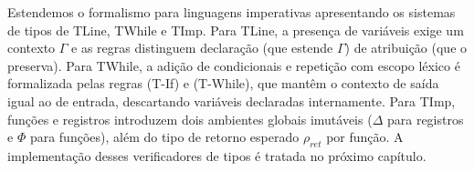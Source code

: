 Estendemos o formalismo para linguagens imperativas apresentando os
sistemas de tipos de TLine, TWhile e TImp. Para TLine, a presença de
variáveis exige um contexto \(\Gamma\) e as regras distinguem
declaração (que estende \(\Gamma\)) de atribuição (que o preserva).
Para TWhile, a adição de condicionais e repetição com escopo léxico é
formalizada pelas regras (T-If) e (T-While), que mantêm o contexto de
saída igual ao de entrada, descartando variáveis declaradas internamente.
Para TImp, funções e registros introduzem dois ambientes globais
imutáveis (\(\Delta\) para registros e \(\Phi\) para funções),
além do tipo de retorno esperado \(\rho_{\mathit{ret}}\) por função. A
implementação desses verificadores de tipos é tratada no próximo capítulo.
